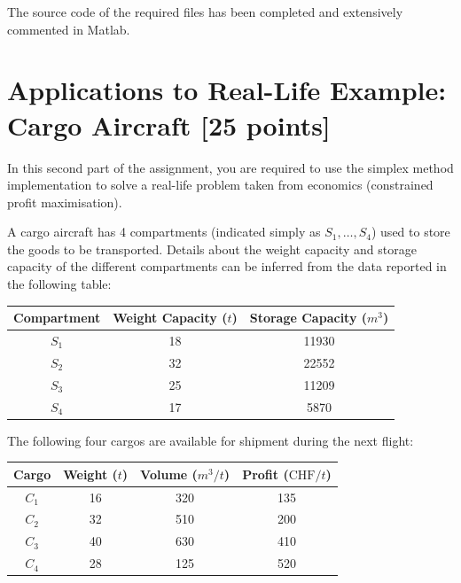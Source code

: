 \documentclass[unicode,11pt,a4paper,oneside,numbers=endperiod,openany]{scrartcl}
\begin{document}
\vspace{0.5cm}\noindent
The source code of the required files has been completed and extensively commented in Matlab.

\section{Applications to Real-Life Example: Cargo Aircraft [25 points]}

In this second part of the assignment, you are required to use the simplex method implementation to solve a real-life problem taken from economics (constrained profit maximisation).

A cargo aircraft has 4 compartments (indicated simply as $S_1,\dots,S_4$) used to store the goods to be transported. Details about the weight capacity and storage capacity of the different compartments can be inferred from the data reported in the following table:

\begin{center}
	\begin{tabular}{||c | c | c ||}
		\hline
		Compartment & Weight Capacity ($t$) & Storage Capacity ($m^3$) \\ [0.5ex]
		\hline\hline
		$S_1$       & 18                    & 11930                    \\
		\hline
		$S_2$       & 32                    & 22552                    \\
		\hline
		$S_3$       & 25                    & 11209                    \\
		\hline
		$S_4$       & 17                    & 5870                     \\
		\hline
	\end{tabular}
\end{center}

The following four cargos are available for shipment during the next flight:

\begin{center}
	\begin{tabular}{|| c | c | c | c ||}
		\hline
		Cargo & Weight ($t$) & Volume ($m^3/t$) & Profit ($\text{CHF}/t$) \\ [0.5ex]
		\hline\hline
		$C_1$ & 16           & 320              & 135                     \\
		\hline
		$C_2$ & 32           & 510              & 200                     \\
		\hline
		$C_3$ & 40           & 630              & 410                     \\
		\hline
		$C_4$ & 28           & 125              & 520                     \\
		\hline
	\end{tabular}
\end{center}
\end{document}
